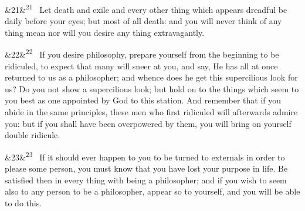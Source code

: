 \documentclass[12pt]{article}
\newcommand{\para}[1][]{\par\noindent\ifx&#1&\else\textsuperscript{\footnotesize #1}~\fi}
\begin{document}
\para[21] Let death and exile and every other thing which appears dreadful be daily before your eyes; but most of all death: and you will never think of any thing mean nor will you desire any thing extravagantly.

\para[22] If you desire philosophy, prepare yourself from the beginning to be ridiculed, to expect that many will sneer at you, and say, He has all at once returned to us as a philosopher; and whence does he get this supercilious look for us? Do you not show a supercilious look; but hold on to the things which seem to you best as one appointed by God to this station. And remember that if you abide in the same principles, these men who first ridiculed will afterwards admire you: but if you shall have been overpowered by them, you will bring on yourself double ridicule.

\para[23] If it should ever happen to you to be turned to externals in order to please some person, you must know that you have lost your purpose in life. Be satisfied then in every thing with being a philosopher; and if you wish to seem also to any person to be a philosopher, appear so to yourself, and you will be able to do this.
\end{document}
